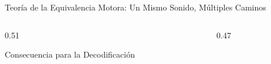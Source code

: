 \begin{frame}{Teoría de la Equivalencia Motora: Un Mismo Sonido, Múltiples Caminos}
\begin{columns}[c]
\begin{column}{0.51\textwidth}
\begin{alertblock}{Consecuencia para la Decodificación}
\begin{itemize}
                \end{itemize}
            \end{alertblock}
        \end{column}
        \begin{column}{0.47\textwidth}
            \centering
        \end{column}
    \end{columns}
\end{frame}

